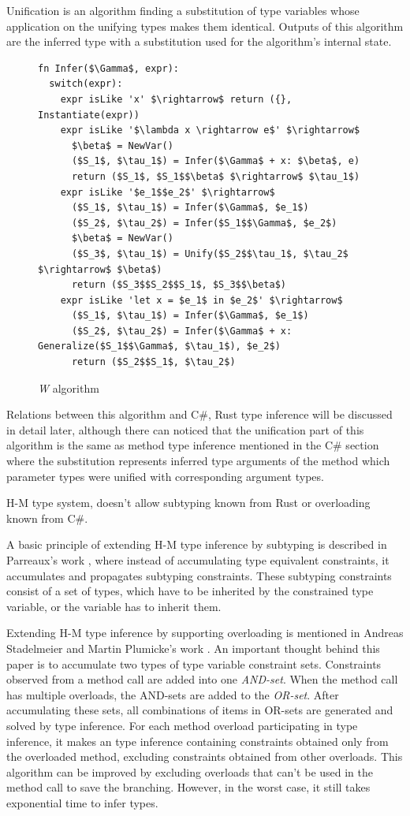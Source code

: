 Unification is an algorithm finding a substitution of type variables whose application on the unifying types makes them identical. 
Outputs of this algorithm are the inferred type with a substitution used for the algorithm's internal state. 
\begin{figure}
\begin{lstlisting}[style=myAlgo, mathescape=true]
fn Infer($\Gamma$, expr):
  switch(expr):
    expr isLike 'x' $\rightarrow$ return ({}, Instantiate(expr))
    expr isLike '$\lambda x \rightarrow e$' $\rightarrow$
      $\beta$ = NewVar()
      ($S_1$, $\tau_1$) = Infer($\Gamma$ + x: $\beta$, e)
      return ($S_1$, $S_1$$\beta$ $\rightarrow$ $\tau_1$)
    expr isLike '$e_1$$e_2$' $\rightarrow$
      ($S_1$, $\tau_1$) = Infer($\Gamma$, $e_1$)
      ($S_2$, $\tau_2$) = Infer($S_1$$\Gamma$, $e_2$)
      $\beta$ = NewVar()
      ($S_3$, $\tau_1$) = Unify($S_2$$\tau_1$, $\tau_2$ $\rightarrow$ $\beta$)
      return ($S_3$$S_2$$S_1$, $S_3$$\beta$)
    expr isLike 'let x = $e_1$ in $e_2$' $\rightarrow$
      ($S_1$, $\tau_1$) = Infer($\Gamma$, $e_1$)
      ($S_2$, $\tau_2$) = Infer($\Gamma$ + x: Generalize($S_1$$\Gamma$, $\tau_1$), $e_2$)
      return ($S_2$$S_1$, $\tau_2$)
\end{lstlisting}
\caption{\textit{W} algorithm}
\label{img16:w}
\end{figure}
\par
Relations between this algorithm and C\#, Rust type inference will be discussed in detail later, although there can noticed that the unification part of this algorithm is the same as method type inference mentioned in the C\# section where the substitution represents inferred type arguments of the method which parameter types were unified with corresponding argument types.
\par
H-M type system, doesn't allow subtyping known from Rust or overloading known from C\#.  
\par
A basic principle of extending H-M type inference by subtyping is described in Parreaux's work \cite{paper:Parreaux}, where instead of accumulating type equivalent constraints, it accumulates and propagates subtyping constraints.
These subtyping constraints consist of a set of types, which have to be inherited by the constrained type variable, or the variable has to inherit them.
\par
Extending H-M type inference by supporting overloading is mentioned in Andreas Stadelmeier and Martin Plumicke's work \cite{paper:Overloading}.
An important thought behind this paper is to accumulate two types of type variable constraint sets.
Constraints observed from a method call are added into one \textit{AND-set}.
When the method call has multiple overloads, the AND-sets are added to the \textit{OR-set}.
After accumulating these sets, all combinations of items in OR-sets are generated and solved by type inference.
For each method overload participating in type inference, it makes an type inference containing constraints obtained only from the overloaded method, excluding constraints obtained from other overloads.
This algorithm can be improved by excluding overloads that can't be used in the method call to save the branching.
However, in the worst case, it still takes exponential time to infer types.


